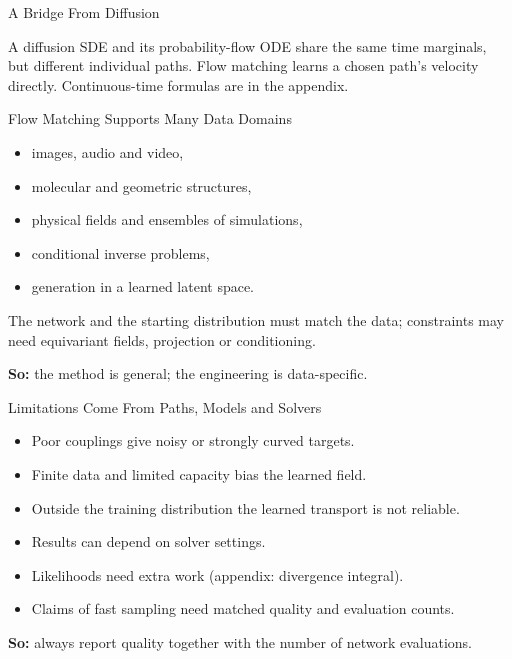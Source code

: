 \documentclass{ntuabeamer}
\begin{document}
\begin{frame}{A Bridge From Diffusion}
  \begin{center}
  \end{center}
  A diffusion SDE and its probability-flow ODE share the same time marginals, but different individual paths. Flow matching learns a chosen path's velocity directly. Continuous-time formulas are in the appendix.
\end{frame}

\begin{frame}{Flow Matching Supports Many Data Domains}
  \begin{itemize}
    \item images, audio and video,
    \item molecular and geometric structures,
    \item physical fields and ensembles of simulations,
    \item conditional inverse problems,
    \item generation in a learned latent space.
  \end{itemize}
  The network and the starting distribution must match the data; constraints may need equivariant fields, projection or conditioning.

  \medskip
  \textbf{So:} the method is general; the engineering is data-specific.
\end{frame}

\begin{frame}{Limitations Come From Paths, Models and Solvers}
  \begin{itemize}
    \item Poor couplings give noisy or strongly curved targets.
    \item Finite data and limited capacity bias the learned field.
    \item Outside the training distribution the learned transport is not reliable.
    \item Results can depend on solver settings.
    \item Likelihoods need extra work (appendix: divergence integral).
    \item Claims of fast sampling need matched quality and evaluation counts.
  \end{itemize}
  \textbf{So:} always report quality together with the number of network evaluations.
\end{frame}
\end{document}
